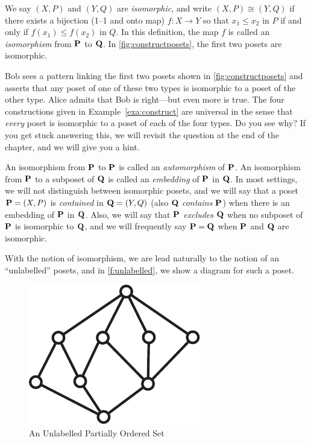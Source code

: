 We say $(X,P)$ and $(Y,Q)$ are \textit{isomorphic}, and write $(X,P)
\cong(Y,Q)$ if there exists a bijection (1--1 and
onto map) $f:X\to Y$ so that $x_1\le x_2$ in $P$ if and only if
$f(x_1)\le f(x_2)$ in $Q$. In this definition, the map $f$ is called an
\textit{isomorphism} from $\mathbf{P}$ to $\mathbf{Q}$.  In \autoref{fig:constructposets},
the first two posets are isomorphic.

\begin{remark}  Bob sees a pattern linking the first two posets
shown in \autoref{fig:constructposets} and asserts that any poset of one of these
two types is isomorphic to a poset of the other type.  Alice admits that Bob
is right---but even more is true.  The four constructions given in 
Example~\ref{exa:construct} are universal in the sense that \textit{every}
poset is isomorphic to a poset of each of the four types.  Do you see why? 
If you get stuck answering this, we will revisit the question at the
end of the chapter, and we will give you a hint.
\end{remark}

An isomorphism from $\mathbf{P}$ to 
$\mathbf{P}$ is called an \textit{automorphism} of $\mathbf{P}$. An isomorphism from 
$\mathbf{P}$ to a subposet of $\mathbf{Q}$ is called an \textit{embedding} of
$\mathbf{P}$ in $\mathbf{Q}$. In most settings, we will not distinguish between
isomorphic posets, and we will say that a poset $\mathbf{P}=(X,P)$ is \textit{contained}
in $\mathbf{Q}=(Y,Q)$ (also $\mathbf{Q}$ \textit{contains} $\mathbf{P}$) when there is an
embedding of $\mathbf{P}$ in $\mathbf{Q}$. Also, we will say that $\mathbf{P}$ \textit{excludes}
$\mathbf{Q}$ when no subposet of $\mathbf{P}$ is isomorphic to $\mathbf{Q}$, and we will 
frequently say $\mathbf{P}=\mathbf{Q}$ when $\mathbf{P}$ and $\mathbf{Q}$ are isomorphic.

With the notion of isomorphism, we are lead naturally to the notion of
an ``unlabelled'' posets, and in \autoref{f:unlabelled}, we show a
diagram for such a poset.

\begin{figure}[hb]
\begin{center}
\includegraphics*[scale=.4]{posets-figs/wttfig-5.pdf}
\caption{\label{f:unlabelled}An Unlabelled Partially Ordered Set}
\end{center}
\end{figure}

